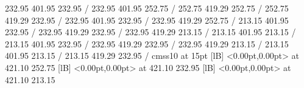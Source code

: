 { 232.95 401.95 232.95 /
\setsolid
{} 232.95 401.95 252.75 /
 252.75 419.29 252.75 /
 252.75 419.29 232.95 /
 232.95 401.95 232.95 /
\setsolid
{} 232.95 419.29 252.75 /
\setsolid
{} 213.15 401.95 232.95 /
 232.95 419.29 232.95 /
 232.95 419.29 213.15 /
 213.15 401.95 213.15 /
\setsolid
{} 213.15 401.95 232.95 /
 232.95 419.29 232.95 /
 232.95 419.29 213.15 /
 213.15 401.95 213.15 /
\setsolid
{} 213.15 419.29 232.95 /
\font\picfont cmss10 at 15pt\picfont
{}  [lB] <0.00pt,0.00pt> at 421.10 252.75
  [lB] <0.00pt,0.00pt> at 421.10 232.95
  [lB] <0.00pt,0.00pt> at 421.10 213.15
\endpicture
}
